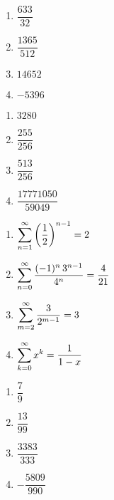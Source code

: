 \begin{multicols}{4}
\begin{enumerate}
\setcounter{enumi}{\value{HW}}

\item $\dfrac{633}{32}$

\item $\dfrac{1365}{512}$

\item  $14652$

\item  $-5396$

\setcounter{HW}{\value{enumi}}
\end{enumerate}
\end{multicols}

\begin{multicols}{4}
\begin{enumerate}
\setcounter{enumi}{\value{HW}}

\item  $3280$

\item  $\dfrac{255}{256}$



\item $\dfrac{513}{256}$

\item $\dfrac{17771050}{59049}$

\setcounter{HW}{\value{enumi}}
\end{enumerate}
\end{multicols}

\begin{multicols}{4}
\begin{enumerate}
\setcounter{enumi}{\value{HW}}

\item $\displaystyle{ \sum_{n = 1}^{\infty} \left( \frac{1}{2} \right)^{n-1} = 2}$  
\item $\displaystyle{ \sum_{n = 0}^{\infty}  \dfrac{(-1)^n \, 3^{n-1}}{4^{n}} = \frac{4}{21}}$ 
\item $\displaystyle{ \sum_{m = 2}^{\infty}   \dfrac{3}{2^{m-1}} = 3}$ 
\item $\displaystyle{ \sum_{k =0}^{\infty}  x^{k} = \frac{1}{1-x}}$
\setcounter{HW}{\value{enumi}}
\end{enumerate}
\end{multicols}



\begin{multicols}{4}
\begin{enumerate}
\setcounter{enumi}{\value{HW}}



\item $\dfrac{7}{9}$

\item $\dfrac{13}{99}$


\item $\dfrac{3383}{333}$
\item $-\dfrac{5809}{990}$

\setcounter{HW}{\value{enumi}}
\end{enumerate}
\end{multicols}



